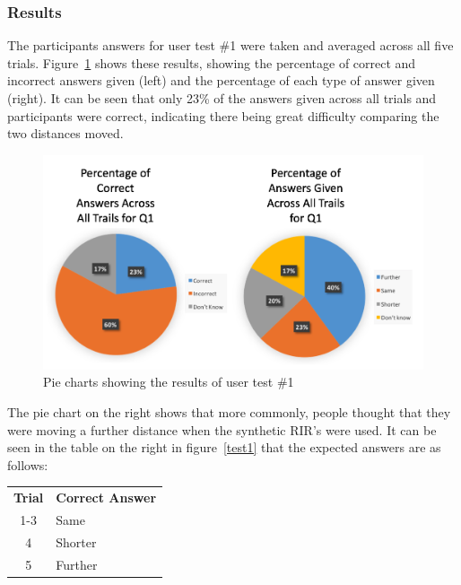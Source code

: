 \documentclass[../../main.tex]{subfiles}
\begin{document}
		\subsubsection{Results}
			The participants answers for user test \#1 were taken and averaged across all five trials. Figure~\ref{test1Results} shows these results, showing the percentage of correct and incorrect answers given (left) and the percentage of each type of answer given (right). It can be seen that only 23\% of the answers given across all trials and participants were correct, indicating there being great difficulty comparing the two distances moved.

			\begin{figure}[t]
				\centerline{\includegraphics[width=\textwidth]{Sections/userTesting/images/test1/Q1Pies.png}}
				\caption{Pie charts showing the results of user test \#1}
				\label{test1Results}
			\end{figure}	
			
			The pie chart on the right shows that more commonly, people thought that they were moving a further distance when the synthetic \ac{RIR}'s were used. It can be seen in the table on the right in figure~\ref{test1} that the expected answers are as follows:

			\begin{center}
			\begin{tabular}{c l}
			\textbf{Trial} & \textbf{Correct Answer} \\
			1-3 & Same \\
			4 & Shorter \\
			5 & Further
			\end{tabular}
			\end{center}
\end{document}
